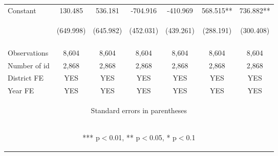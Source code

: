 \begin{center}
\begin{tabular}{lcccccc}
Constant & 130.485 & 536.181 & -704.916 & -410.969 & 568.515** & 736.882** \\
 & \begin{footnotesize}(649.998)\end{footnotesize} & \begin{footnotesize}(645.982)\end{footnotesize} & \begin{footnotesize}(452.031)\end{footnotesize} & \begin{footnotesize}(439.261)\end{footnotesize} & \begin{footnotesize}(288.191)\end{footnotesize} & \begin{footnotesize}(300.408)\end{footnotesize} \\
\vspace{4pt} & \begin{footnotesize}\end{footnotesize} & \begin{footnotesize}\end{footnotesize} & \begin{footnotesize}\end{footnotesize} & \begin{footnotesize}\end{footnotesize} & \begin{footnotesize}\end{footnotesize} & \begin{footnotesize}\end{footnotesize} \\
Observations & 8,604 & 8,604 & 8,604 & 8,604 & 8,604 & 8,604 \\
Number of id & 2,868 & 2,868 & 2,868 & 2,868 & 2,868 & 2,868 \\
District FE & YES & YES & YES & YES & YES & YES \\
 Year FE & YES & YES & YES & YES & YES & YES \\ \hline
\multicolumn{7}{c}{\begin{footnotesize} Standard errors in parentheses\end{footnotesize}} \\
\multicolumn{7}{c}{\begin{footnotesize} *** p$<$0.01, ** p$<$0.05, * p$<$0.1\end{footnotesize}} \\
\end{tabular}
\end{center}

